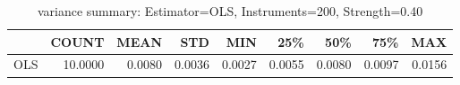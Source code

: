 \begin{table}[ht]
\centering
\caption{variance summary: Estimator=OLS, Instruments=200, Strength=0.40}
\begin{tabular}{lrrrrrrrr}
\toprule
 & COUNT & MEAN & STD & MIN & 25\% & 50\% & 75\% & MAX \\
\midrule
OLS & 10.0000 & 0.0080 & 0.0036 & 0.0027 & 0.0055 & 0.0080 & 0.0097 & 0.0156 \\
\bottomrule
\end{tabular}
\end{table}
